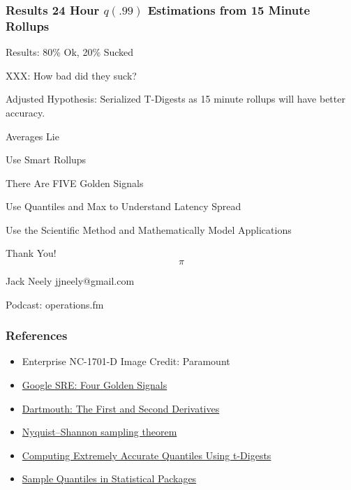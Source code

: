 \begin{frame}
    \frametitle{Results 24 Hour $q(.99)$ Estimations from 15 Minute Rollups}
    Results: 80\% Ok, 20\% Sucked

    XXX: How bad did they suck?

    Adjusted Hypothesis: Serialized T-Digests as 15 minute rollups will have better accuracy.
\end{frame}




\begin{frame}[standout]
    \small

    Averages Lie

    Use Smart Rollups

    There Are FIVE Golden Signals

    Use Quantiles and Max to Understand Latency Spread

    Use the Scientific Method and Mathematically Model Applications
\end{frame}

\begin{frame}[standout]
    Thank You!
    $$\pi$$

    \small
    Jack Neely
    jjneely@gmail.com

    Podcast: operations.fm
\end{frame}

\appendix

\begin{frame}
    \frametitle{References}

    \begin{itemize}
        \item Enterprise NC-1701-D Image Credit: Paramount
        \item \href{https://sre.google/sre-book/monitoring-distributed-systems/}{\alert{Google SRE: Four Golden Signals}}
        \item \href{https://math.dartmouth.edu/opencalc2/cole/lecture8.pdf}{\alert{Dartmouth: The First and Second Derivatives}}
        \item \href{https://en.wikipedia.org/wiki/Nyquist\%E2\%80\%93Shannon_sampling_theorem}{\alert{Nyquist–Shannon sampling theorem}}
        \item \href{https://github.com/tdunning/t-digest/blob/main/docs/t-digest-paper/histo.pdf}{\alert{Computing Extremely Accurate Quantiles Using t-Digests}}
        \item \href{https://www.researchgate.net/publication/222105754_Sample_Quantiles_in_Statistical_Packages}{\alert{Sample Quantiles in Statistical Packages}}
    \end{itemize}
\end{frame}

